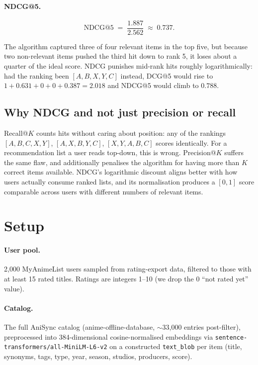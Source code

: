\documentclass[11pt]{article}
\begin{document}
\paragraph{NDCG@5.}
\[
\mathrm{NDCG@}5 \;=\; \frac{1.887}{2.562} \;\approx\; 0.737.
\]

The algorithm captured three of four relevant items in the top five, but
because two non-relevant items pushed the third hit down to rank 5, it
loses about a quarter of the ideal score. NDCG punishes mid-rank hits
roughly logarithmically: had the ranking been
$[A, B, X, Y, C]$ instead, DCG@5 would rise to
$1 + 0.631 + 0 + 0 + 0.387 = 2.018$ and NDCG@5 would climb to $0.788$.

\subsection{Why NDCG and not just precision or recall}

Recall@$K$ counts hits without caring about position: any of the rankings
$[A,B,C,X,Y]$, $[A,X,B,Y,C]$, $[X,Y,A,B,C]$ scores identically. For a
recommendation list a user reads top-down, this is wrong. Precision@$K$
suffers the same flaw, and additionally penalises the algorithm for
having more than $K$ correct items available. NDCG's logarithmic
discount aligns better with how users actually consume ranked lists, and
its normalisation produces a $[0, 1]$ score comparable across users with
different numbers of relevant items.

\section{Setup}

\paragraph{User pool.}
2{,}000 MyAnimeList users sampled from rating-export data, filtered to
those with at least 15 rated titles. Ratings are integers 1--10 (we drop
the 0 ``not rated yet'' value).

\paragraph{Catalog.}
The full AniSync catalog (anime-offline-database, $\sim$33{,}000 entries
post-filter), preprocessed into 384-dimensional cosine-normalised
embeddings via \texttt{sentence-transformers/all-MiniLM-L6-v2} on a
constructed \texttt{text\_blob} per item (title, synonyms, tags, type,
year, season, studios, producers, score).
\end{document}
